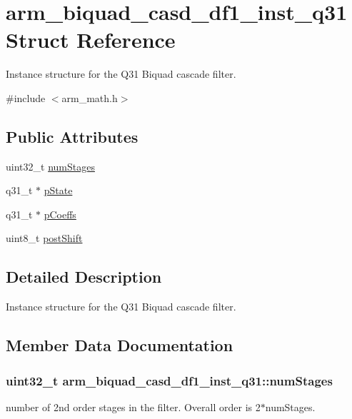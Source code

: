 \hypertarget{structarm__biquad__casd__df1__inst__q31}{}\section{arm\+\_\+biquad\+\_\+casd\+\_\+df1\+\_\+inst\+\_\+q31 Struct Reference}
\label{structarm__biquad__casd__df1__inst__q31}


Instance structure for the Q31 Biquad cascade filter.  




{\ttfamily \#include $<$arm\+\_\+math.\+h$>$}

\subsection*{Public Attributes}
\begin{DoxyCompactItemize}
\item 
uint32\+\_\+t \hyperlink{structarm__biquad__casd__df1__inst__q31_a2c2b579f1df1d8273a5d9d945c27e1b2}{num\+Stages}
\item 
q31\+\_\+t $\ast$ \hyperlink{structarm__biquad__casd__df1__inst__q31_a5dcf4727f58eb4e8e8b392508d8657bb}{p\+State}
\item 
q31\+\_\+t $\ast$ \hyperlink{structarm__biquad__casd__df1__inst__q31_aa62366c632f3b5305086f841f079dbd2}{p\+Coeffs}
\item 
uint8\+\_\+t \hyperlink{structarm__biquad__casd__df1__inst__q31_a636c7fbe09ec4bef0bc0a4b4e2151cbe}{post\+Shift}
\end{DoxyCompactItemize}


\subsection{Detailed Description}
Instance structure for the Q31 Biquad cascade filter. 

\subsection{Member Data Documentation}
\subsubsection[{\texorpdfstring{num\+Stages}{numStages}}]{\setlength{\rightskip}{0pt plus 5cm}uint32\+\_\+t arm\+\_\+biquad\+\_\+casd\+\_\+df1\+\_\+inst\+\_\+q31\+::num\+Stages}\hypertarget{structarm__biquad__casd__df1__inst__q31_a2c2b579f1df1d8273a5d9d945c27e1b2}{}\label{structarm__biquad__casd__df1__inst__q31_a2c2b579f1df1d8273a5d9d945c27e1b2}
number of 2nd order stages in the filter. Overall order is 2$\ast$num\+Stages. 
